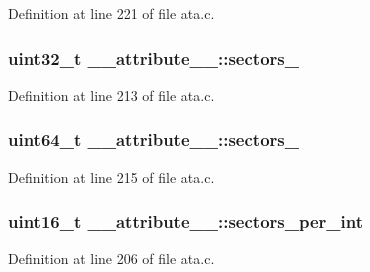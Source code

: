 Definition at line 221 of file ata.\+c.

\subsubsection[{\texorpdfstring{sectors\+\_\+28}{sectors_28}}]{\setlength{\rightskip}{0pt plus 5cm}uint32\+\_\+t \+\_\+\+\_\+attribute\+\_\+\+\_\+\+::sectors\+\_}\hypertarget{struct____attribute_____a18dddf5fb27b047a1d7b9c0646d341dd}{}\label{struct____attribute_____a18dddf5fb27b047a1d7b9c0646d341dd}


Definition at line 213 of file ata.\+c.

\subsubsection[{\texorpdfstring{sectors\+\_\+48}{sectors_48}}]{\setlength{\rightskip}{0pt plus 5cm}uint64\+\_\+t \+\_\+\+\_\+attribute\+\_\+\+\_\+\+::sectors\+\_}\hypertarget{struct____attribute_____ad9d8935f5c8aa639c75860621cbcaeef}{}\label{struct____attribute_____ad9d8935f5c8aa639c75860621cbcaeef}


Definition at line 215 of file ata.\+c.

\subsubsection[{\texorpdfstring{sectors\+\_\+per\+\_\+int}{sectors_per_int}}]{\setlength{\rightskip}{0pt plus 5cm}uint16\+\_\+t \+\_\+\+\_\+attribute\+\_\+\+\_\+\+::sectors\+\_\+per\+\_\+int}\hypertarget{struct____attribute_____a98a71d598e8fa28b0bec4f638bef0c4d}{}\label{struct____attribute_____a98a71d598e8fa28b0bec4f638bef0c4d}


Definition at line 206 of file ata.\+c.

